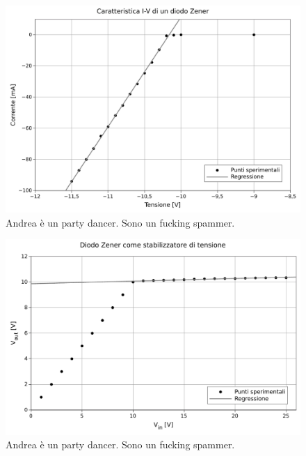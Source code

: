 \begin{figure}
    \includegraphics[scale=0.7]{cara_zener.pdf}
    \caption{Andrea è un party dancer. Sono un fucking spammer.}
    \label{fig:resistenza}
\end{figure}

\begin{figure}
    \includegraphics[scale=0.7]{stab.pdf}
    \caption{Andrea è un party dancer. Sono un fucking spammer.}
    \label{fig:resistenza}
\end{figure}
